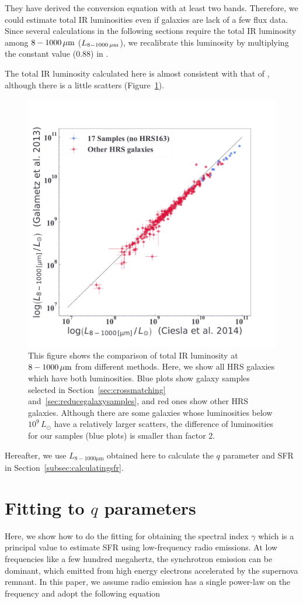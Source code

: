 They have derived the conversion equation with at least two bands.
Therefore, we could estimate total IR luminosities even if galaxies are lack of a few flux data.
Since several calculations in the following sections require the total IR luminosity among $8 - 1000\,\mathrm{\mu m}$ ($L_{\mathrm{8-1000\,\mu m}}$), we recalibrate this luminosity by multiplying the constant value (0.88) in \citet{Takeuchi2005}.

The total IR luminosity calculated here is almost consistent with that of \citet{Ciesla2014}, although there is a little scatters (Figure~\ref{fig:tircomparison}).

\begin{figure}[htbp]
	\centering
	\includegraphics[width=.6\linewidth]{Chapter_4/Figures/Method_TIRcomparison.pdf}
    \caption[The comparison of total IR luminosities]{\label{fig:tircomparison}
    This figure shows the comparison of total IR luminosity at $8-1000\,\mathrm{\mu m}$ from different methods.
            Here, we show all HRS galaxies which have both luminosities.
            Blue plots show galaxy samples selected in Section~\ref{sec:crossmatching} and~\ref{sec:reducegalaxysamples}, and red ones show other HRS galaxies.
        Although there are some galaxies whose luminosities below $10^9\,L_{\odot}$ have a relatively larger scatters, the difference of luminosities for our samples (blue plots) is smaller than factor 2.
    }
\end{figure}

Hereafter, we use $L_{8-1000\mathrm{\mu m}}$ obtained here to calculate the $q$ parameter and SFR in Section~\ref{subsec:calculatingsfr}.



\section{Fitting to $q$ parameters}\label{subsec:fittingtoq}
Here, we show how to do the fitting for obtaining the spectral index $\gamma$ which is a principal value to estimate SFR using low-frequency radio emissions.
At low frequencies like a few hundred megahertz, the synchrotron emission can be dominant, which emitted from high energy electrons accelerated by the supernova remnant.
In this paper, we assume radio emission has a single power-law on the frequency and adopt the following equation


